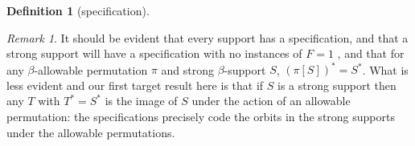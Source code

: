 \documentclass[112pt]{article}
\theoremstyle{definition}
\newtheorem{definition}[theorem]{Definition}
\theoremstyle{remark}
\newtheorem{remark}[theorem]{Remark}
\newcommand{\rk}[1]{{\color{blue}\sl #1}}
\newcommand{\hsuggest}[1]{{\color{magenta}#1}}
\begin{document}
\begin{definition}[specification]
\begin{enumerate}

\end{enumerate}
\end{definition}

\begin{remark}
It should be evident that every support has a specification, and that a strong support will have a specification with no instances of $F = 1$%
, and that for any $\beta$-allowable permutation $\pi$ and strong $\beta$-support $S$,
$(\pi[S])^* = S^*$.  What is less evident and our first target result here is that if $S$ is a strong support then any $T$ with $T^* = S^*$ is the image of $S$ under the action of an allowable permutation:  the specifications precisely code the orbits in the strong supports under the allowable permutations.
\end{remark}
\end{document}
